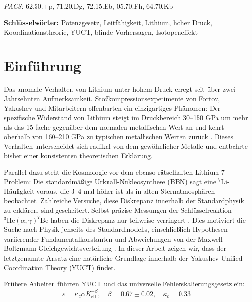 \documentclass[12pt,a4paper]{article}
\theoremstyle{remark}
\newcommand{\Ke}{K_{\mathrm{eff}}}
\newcommand{\kappac}{\kappa_c}
\newcommand{\alp}{\alpha}
\newcommand{\pacs}{\textit{PACS:} 62.50.+p, 71.20.Dg, 72.15.Eb, 05.70.Fh, 64.70.Kb}
\begin{document}
\begin{titlepage}
\begin{center}
			\vspace{0.5cm}
			\noindent \pacs
			
			\vspace{0.5cm}
			\noindent \textbf{Schlüsselwörter:} Potenzgesetz, Leitfähigkeit, Lithium, hoher Druck, Koordinationstheorie, YUCT, blinde Vorhersagen, Isotopeneffekt
		\end{center}
	\end{titlepage}
	
	\tableofcontents
	\newpage
	
	\section{Einführung}
	
	Das anomale Verhalten von Lithium unter hohem Druck erregt seit über zwei Jahrzehnten Aufmerksamkeit. Stoßkompressionsexperimente von Fortov, Yakushev und Mitarbeitern \cite{fortov2001, yakushev2002, fortov1999} offenbarten ein einzigartiges Phänomen: Der spezifische Widerstand von Lithium steigt im Druckbereich 30–150 GPa um mehr als das 15‑fache gegenüber dem normalen metallischen Wert an und kehrt oberhalb von 160–210 GPa zu typischen metallischen Werten zurück \cite{fortov2001, yakushev2002}. Dieses Verhalten unterscheidet sich radikal von dem gewöhnlicher Metalle und entbehrte bisher einer konsistenten theoretischen Erklärung.
	
	Parallel dazu steht die Kosmologie vor dem ebenso rätselhaften Lithium-7-Problem: Die standardmäßige Urknall-Nukleosynthese (BBN) sagt eine \(^7\)Li-Häufigkeit voraus, die 3–4 mal höher ist als in alten Sternatmosphären beobachtet. Zahlreiche Versuche, diese Diskrepanz innerhalb der Standardphysik zu erklären, sind gescheitert. Selbst präzise Messungen der Schlüsselreaktion \(^3\mathrm{He}(\alpha,\gamma)^7\mathrm{Be}\) haben die Diskrepanz nur teilweise verringert \cite{IAEA2017}. Dies motiviert die Suche nach Physik jenseits des Standardmodells, einschließlich Hypothesen variierender Fundamentalkonstanten \cite{HAL2006} und Abweichungen von der Maxwell–Boltzmann-Gleichgewichtsverteilung \cite{bertulani2015}. In dieser Arbeit zeigen wir, dass der letztgenannte Ansatz eine natürliche Grundlage innerhalb der Yakushev Unified Coordination Theory (YUCT) findet.
	
	Frühere Arbeiten \cite{yuct2026, appendixL, appendixC} führten YUCT und das universelle Fehlerskalierungsgesetz ein:
	\begin{equation}
		\varepsilon = \kappac \alp \Ke^{-\beta}, \quad \beta = 0.67 \pm 0.02, \quad \kappac = 0.33
		\label{eq:universal}
	\end{equation}
	
\end{document}
